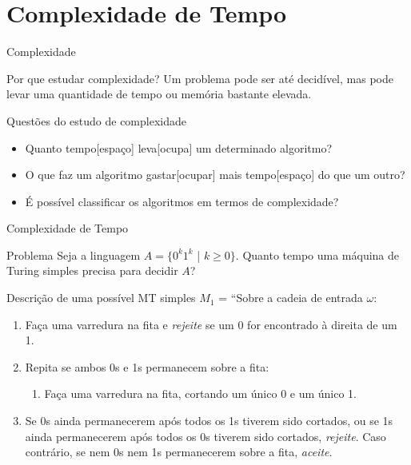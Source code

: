 \documentclass[xcolor=dvipsnames,table]{beamer}
\begin{document}
		\section{Complexidade de Tempo}	
	\begin{frame}{Complexidade}
		\begin{block}{Por que estudar complexidade?}
			Um problema pode ser até decidível, mas pode levar uma quantidade de tempo ou memória bastante elevada.
		\end{block} \pause
		\begin{block}{Questões do estudo de complexidade}
			\begin{itemize}
				\item Quanto tempo[espaço] leva[ocupa] um determinado algoritmo?
				\item O que faz um algoritmo gastar[ocupar] mais tempo[espaço] do que um outro?
				\item É possível classificar os algoritmos em termos de complexidade?
			\end{itemize}
		\end{block}
	\end{frame}
	
	\begin{frame}[shrink]{Complexidade de Tempo}
		\begin{block}{Problema}
			Seja a linguagem $A = \{ 0^k 1^k$ | $k \geq 0 \}$. Quanto tempo uma máquina de Turing simples precisa para decidir $A$?
		\end{block} \pause
		\begin{block}{Descrição de uma possível MT simples}
			$M_1$ = ``Sobre a cadeia de entrada $\omega$:
			\begin{enumerate}
				\item Faça uma varredura na fita e {\it rejeite} se um 0 for encontrado à direita de um 1.
				\item Repita se ambos 0s e 1s permanecem sobre a fita:
				\begin{enumerate}
					\item Faça uma varredura na fita, cortando um único 0 e um único 1.
				\end{enumerate}
				\item Se 0s ainda permanecerem após todos os 1s tiverem sido cortados, ou se 1s ainda permanecerem após todos os 0s tiverem sido cortados, {\it rejeite}. Caso contrário, se nem 0s nem 1s permanecerem sobre a fita, {\it aceite}.
			\end{enumerate}
		\end{block}
	\end{frame}
	
\end{document}
